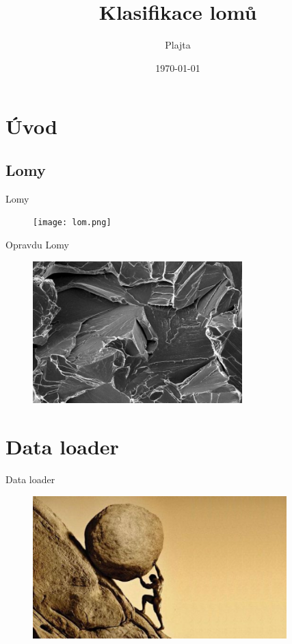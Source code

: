 \documentclass[aspectratio=169]{beamer}
\title[Klasifikace lomů]{\textbf{Klasifikace lomů}}
\author{Plajta}
\institute{VOŠ a SPŠE Plzeň}
\date{\today}
\begin{document}
\captionsetup[subfigure]{labelformat=empty}
\captionsetup{labelformat=empty}

\begin{frame}
  \titlepage
\end{frame}


\section{Úvod}

\subsection{Lomy}

\begin{frame}{Lomy}
    \begin{figure}
        \centering
        \texttt{[image: lom.png]}
    \end{figure}
\end{frame}

\begin{frame}{Opravdu Lomy}
    \begin{figure}
        \centering
        \includegraphics[height=5.5cm]{stepny.png}
    \end{figure}
\end{frame}

\section{Data loader}

\begin{frame}{Data loader}
    \begin{figure}
        \centering
        \includegraphics[height=5.5cm]{sisyfos.jpg}
    \end{figure}
\end{frame}
\end{document}
